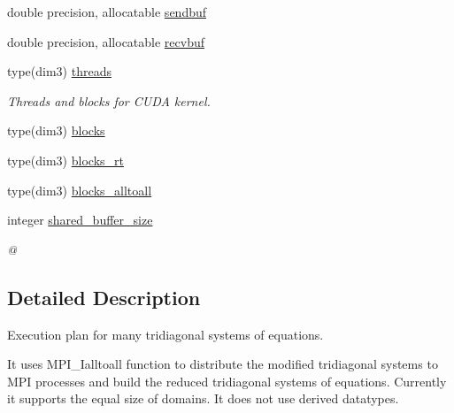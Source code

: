 \textbf{ }\par
\begin{DoxyCompactItemize}
\item 
double precision, allocatable \hyperlink{structpascal__tdma__cuda_1_1ptdma__plan__many__cuda_af5e759a242166d52d508ee3ef7540642}{sendbuf}
\item 
double precision, allocatable \hyperlink{structpascal__tdma__cuda_1_1ptdma__plan__many__cuda_a61fc25b52197944802ea0b7a12153f2d}{recvbuf}
\end{DoxyCompactItemize}

\textbf{ }\par
\begin{DoxyCompactItemize}
\item 
type(dim3) \hyperlink{structpascal__tdma__cuda_1_1ptdma__plan__many__cuda_af863fad6c2a79c6d4fc280f6afbf599d}{threads}
\begin{DoxyCompactList}\small\item\em Threads and blocks for C\+U\+DA kernel. \end{DoxyCompactList}\item 
type(dim3) \hyperlink{structpascal__tdma__cuda_1_1ptdma__plan__many__cuda_ae107096b9e9c849c6b11e210a6a6518d}{blocks}
\item 
type(dim3) \hyperlink{structpascal__tdma__cuda_1_1ptdma__plan__many__cuda_a829ff230c0e063d6254024be776f905b}{blocks\+\_\+rt}
\item 
type(dim3) \hyperlink{structpascal__tdma__cuda_1_1ptdma__plan__many__cuda_a1989eb8901f6e50b833f61ee9447fb37}{blocks\+\_\+alltoall}
\item 
integer \hyperlink{structpascal__tdma__cuda_1_1ptdma__plan__many__cuda_a4a33f2fe35ac3c91c722d87498b230e3}{shared\+\_\+buffer\+\_\+size}
\begin{DoxyCompactList}\small\item\em @ \end{DoxyCompactList}\end{DoxyCompactItemize}



\subsection{Detailed Description}
Execution plan for many tridiagonal systems of equations. 

It uses M\+P\+I\+\_\+\+Ialltoall function to distribute the modified tridiagonal systems to M\+PI processes and build the reduced tridiagonal systems of equations. Currently it supports the equal size of domains. It does not use derived datatypes. 

